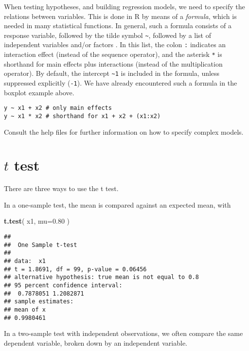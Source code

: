 \documentclass[]{book}
\newenvironment{Shaded}{\begin{snugshade}}{\end{snugshade}}
\newcommand{\DataTypeTok}[1]{\textcolor[rgb]{0.13,0.29,0.53}{#1}}
\newcommand{\FloatTok}[1]{\textcolor[rgb]{0.00,0.00,0.81}{#1}}
\newcommand{\KeywordTok}[1]{\textcolor[rgb]{0.13,0.29,0.53}{\textbf{#1}}}
\newcommand{\NormalTok}[1]{#1}
\begin{document}
When testing hypotheses, and building regression models, we need to
specify the relations between variables. This is done in
R by means of a \emph{formula}, which is needed in many
statistical functions. In general, such a formula consists of a
response variable, followed by the tilde symbol
{\texttt{\textasciitilde{}}}, followed by a list of independent
variables and/or factors \citep{wilk73}.
In this list, the colon
\texttt{:} indicates an interaction effect (instead
of the sequence operator), and the asterisk
\texttt{*} is shorthand for main effects plus
interactions (instead of the multiplication operator).
By default,
the intercept \texttt{\textasciitilde{}1} is included in the
formula, unless suppressed explicitly
(\texttt{-1}). We have already encountered such a formula
in the boxplot example above.

\begin{verbatim}
y ~ x1 + x2 # only main effects 
y ~ x1 * x2 # shorthand for x1 + x2 + (x1:x2) 
\end{verbatim}

Consult the help files for further information on how to specify
complex models.

\hypertarget{t-test}{%
\section{\texorpdfstring{\(t\) test}{t test}}\label{t-test}}

There are three ways to use the t test.

In a one-sample test, the mean is compared against an expected mean,
with

\begin{Shaded}
\begin{Highlighting}[]
\KeywordTok{t.test}\NormalTok{( x1, }\DataTypeTok{mu=}\FloatTok{0.80}\NormalTok{ )}
\end{Highlighting}
\end{Shaded}

\begin{verbatim}
## 
##  One Sample t-test
## 
## data:  x1
## t = 1.8691, df = 99, p-value = 0.06456
## alternative hypothesis: true mean is not equal to 0.8
## 95 percent confidence interval:
##  0.7878051 1.2082871
## sample estimates:
## mean of x 
## 0.9980461
\end{verbatim}

In a two-sample test with independent observations, we often compare
the same dependent variable, broken down by an independent
variable.
\end{document}

